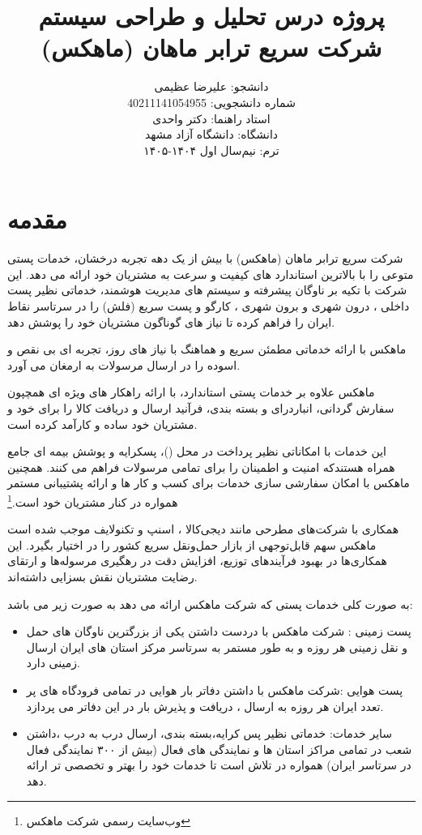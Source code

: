 \documentclass[12pt,a4paper]{report}
\title{پروژه درس تحلیل و طراحی سیستم \\[6pt]
	{\large شرکت سریع ترابر ماهان (ماهکس)}}
\author{
	دانشجو: علیرضا عظیمی \\[4pt]
	شماره دانشجویی:  40211141054955\\[4pt]
	استاد راهنما: دکتر واحدی \\[8pt]
	دانشگاه: دانشگاه آزاد مشهد \\[4pt]
	ترم: نیم‌سال اول ۱۴۰۴-۱۴۰۵
}
\date{}
\begin{document}
	\maketitle
	\tableofcontents
	\newpage
	\chapter{مقدمه}
شرکت سریع ترابر ماهان (ماهکس) با بیش از یک دهه تجربه درخشان،  خدمات پستی متوعی را با بالاترین استاندارد های کیفیت و سرعت  به مشتریان خود ارائه می دهد. این شرکت با تکیه بر ناوگان پیشرفته و سیستم های مدیریت هوشمند، خدماتی نظیر پست داخلی ، درون شهری و برون شهری ، کارگو و پست سریع (فلش) را در سرتاسر نقاط ایران را  فراهم کرده تا نیاز های گوناگون مشتریان خود را پوشش دهد.

ماهکس با ارائه خدماتی مطمئن سریع و هماهنگ با نیاز های روز، تجربه ای  بی نقص و اسوده را در ارسال مرسولات به ارمغان می آورد.

ماهکس علاوه بر خدمات پستی استاندارد، با ارائه راهکار های ویژه ای همچپون سفارش گردانی، انباردرای و بسته بندی، فرآنید ارسال و دریافت کالا را برای خود و مشتریان خود ساده و کارآمد کرده است.

این خدمات با امکاناتی نظیر پرداخت در محل ()، پسکرایه و پوشش بیمه ای جامع همراه هستندکه امنیت و اطمینان را برای تمامی مرسولات فراهم می کنند. همچنین ماهکس با امکان سفارشی سازی خدمات برای کسب و کار ها و ارائه پشتیبانی مستمر همواره در کنار مشتریان خود است.\footnote{وب‌سایت رسمی شرکت ماهکس}

همکاری با شرکت‌های مطرحی مانند دیجی‌کالا ، اسنپ و تکنولایف موجب شده است ماهکس سهم قابل‌توجهی از بازار حمل‌ونقل سریع کشور را در اختیار بگیرد. این همکاری‌ها در بهبود فرآیندهای توزیع، افزایش دقت در رهگیری مرسوله‌ها و ارتقای رضایت مشتریان نقش بسزایی داشته‌اند.

به صورت کلی خدمات پستی که شرکت ماهکس ارائه می دهد به صورت زیر می باشد:
\begin{itemize}
	\item 
پست زمینی : شرکت ماهکس با دردست داشتن یکی از بزرگترین ناوگان های حمل و نقل زمینی هر روزه و به طور مستمر به سرتاسر مرکز استان های ایران ارسال زمینی دارد.
	\item 
پست هوایی :شرکت ماهکس با داشتن دفاتر بار هوایی در تمامی فرودگاه های پر تعدد ایران هر روزه به ارسال ، دریافت و پذیرش بار در این دفاتر می پردازد.
	\item 
سایر خدمات: خدماتی نظیر پس کرایه،بسته بندی، ارسال درب به درب ،داشتن شعب در تمامی مراکز استان ها و  نمایندگی های فعال (بیش از ۳۰۰ نمایندگی فعال در سرتاسر ایران) همواره در تلاش است تا خدمات خود را بهتر و تخصصی تر ارائه دهد.
\end{itemize}
\end{document}
